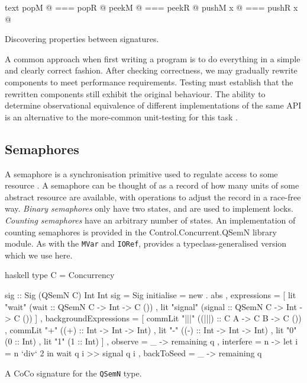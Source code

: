 \begin{listing}
\centering
\begin{cminted}{text}
   popM @  ===  popR @
  peekM @  ===  peekR @
pushM x @  ===  pushR x @
\end{cminted}
\caption{Discovering properties between signatures.}\label{lst:stacks}
\end{listing}

A common approach when first writing a program is to do everything in
a simple and clearly correct fashion.  After checking correctness, we
may gradually rewrite components to meet performance requirements.
Testing must establish that the rewritten components still exhibit the
original behaviour.  The ability to determine observational
equivalence of different implementations of the same API is an
alternative to the more-common unit-testing for this
task \parencite{he1986}.

\subsection{Semaphores}
\label{sec:coco-cases-semaphore}

A semaphore is a synchronisation primitive used to regulate access to
some resource \parencite{ewd123}.  A semaphore can be thought of as a record
of how many units of some abstract resource are available, with
operations to adjust the record in a race-free way.  \emph{Binary
  semaphores} only have two states, and are used to implement
locks. \emph{Counting semaphores} have an arbitrary number of states.
An implementation of counting semaphores is provided in the
Control.Concurrent.QSemN library module.  As with the \verb|MVar| and
\verb|IORef|, \dejafu{} provides a typeclass-generalised version which
we use here.

\begin{listing}
\centering
\begin{cminted}{haskell}
type C = Concurrency

sig :: Sig (QSemN C) Int Int
sig = Sig
  { initialise = new . abs
  , expressions =
    [ lit "wait"   (wait   :: QSemN C -> Int -> C ())
    , lit "signal" (signal :: QSemN C -> Int -> C ())
    ]
  , backgroundExpressions =
    [ commLit "|||" ((|||) :: C A -> C B -> C ())
    , commLit "+"   ((+)   :: Int -> Int -> Int)
    , lit "-"       ((-)   :: Int -> Int -> Int)
    , lit "0" (0 :: Int)
    , lit "1" (1 :: Int)
    ]
  , observe    = \q _ -> remaining q
  , interfere  = \q n -> let i = n `div` 2 in wait q i >> signal q i
  , backToSeed = \q _ -> remaining q
  }
\end{cminted}
\caption{A CoCo signature for the \texttt{QSemN} type.}
\label{lst:sig}
\end{listing}

